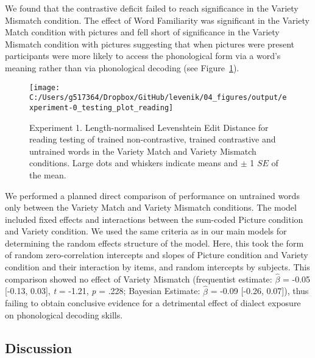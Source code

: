 \documentclass[doc,floatsintext]{apa6}
\begin{document}
We found that the contrastive deficit failed to reach significance in
the Variety Mismatch condition. The effect of Word Familiarity was
significant in the Variety Match condition with pictures and fell short
of significance in the Variety Mismatch condition with pictures
suggesting that when pictures were present participants were more likely
to access the phonological form via a word's meaning rather than via
phonological decoding (see Figure~\ref{fig:ex0-test-plots}).

\newpage

\begin{figure}[H]

{\centering \texttt{[image: C:/Users/g517364/Dropbox/GitHub/levenik/04\_figures/output/experiment-0\_testing\_plot\_reading]} 

}

\caption{Experiment 1. Length-normalised Levenshtein Edit Distance for reading testing of trained non-contrastive, trained contrastive and untrained words in the Variety Match and Variety Mismatch conditions. Large dots and whiskers indicate means and $\pm$ 1 $SE$ of the mean.}\label{fig:ex0-test-plots}
\end{figure}

We performed a planned direct comparison of performance on untrained
words only between the Variety Match and Variety Mismatch conditions.
The model included fixed effects and interactions between the sum-coded
Picture condition and Variety condition. We used the same criteria as in
our main models for determining the random effects structure of the
model. Here, this took the form of random zero-correlation intercepts
and slopes of Picture condition and Variety condition and their
interaction by items, and random intercepts by subjects. This comparison
showed no effect of Variety Mismatch (frequentist estimate:
\(\hat{\beta}\) = -0.05 {[}-0.13, 0.03{]}, \emph{t} = -1.21, \emph{p} =
.228; Bayesian Estimate: \(\hat{\beta}\) = -0.09 {[}-0.26, 0.07{]}),
thus failing to obtain conclusive evidence for a detrimental effect of
dialect exposure on phonological decoding skills.

\subsection{Discussion}\label{discussion}
\end{document}
